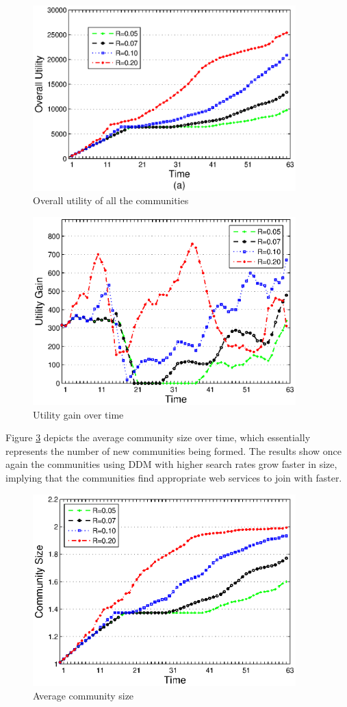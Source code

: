 {\begin{figure}%
\centering
\includegraphics[width=4in]{figures/stats1.eps}
\caption{Overall utility of all the communities}
\label{stats1}
\end{figure}


\begin{figure}%
\centering
\includegraphics[width=4in]{figures/stats2.eps}
\caption{Utility gain over time}
\label{stats2}
\end{figure}

Figure \ref{stats3} depicts the average community size over time, which essentially represents the number of new communities being formed. The results show once again the communities using DDM with higher search rates grow faster in size, implying that the communities find appropriate web services to join with faster.

\begin{figure}%
\centering
\includegraphics[width=4in]{figures/stats3.eps}
\caption{Average community size}
\label{stats3}
\end{figure}



}
